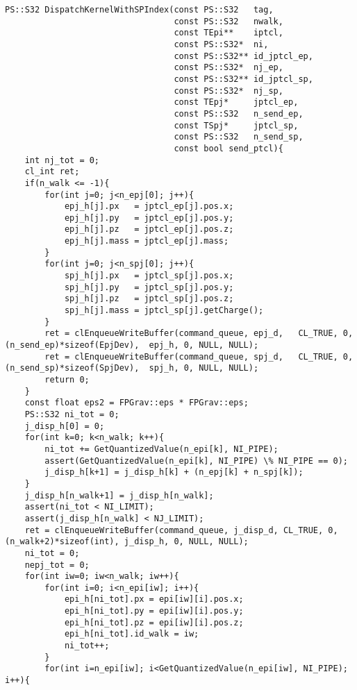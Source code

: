 \begin{itemize}
\begin{lstlisting}[caption=calcForceDispatchExample]
PS::S32 DispatchKernelWithSPIndex(const PS::S32   tag,
                                  const PS::S32   nwalk,
                                  const TEpi**    iptcl,
                                  const PS::S32*  ni,
                                  const PS::S32** id_jptcl_ep,
                                  const PS::S32*  nj_ep,
                                  const PS::S32** id_jptcl_sp,
                                  const PS::S32*  nj_sp,
                                  const TEpj*     jptcl_ep,
                                  const PS::S32   n_send_ep,
                                  const TSpj*     jptcl_sp,
                                  const PS::S32   n_send_sp,
                                  const bool send_ptcl){
    int nj_tot = 0;
    cl_int ret;
    if(n_walk <= -1){
        for(int j=0; j<n_epj[0]; j++){
            epj_h[j].px   = jptcl_ep[j].pos.x;
            epj_h[j].py   = jptcl_ep[j].pos.y;
            epj_h[j].pz   = jptcl_ep[j].pos.z;
            epj_h[j].mass = jptcl_ep[j].mass;
        }
        for(int j=0; j<n_spj[0]; j++){
            spj_h[j].px   = jptcl_sp[j].pos.x;
            spj_h[j].py   = jptcl_sp[j].pos.y;
            spj_h[j].pz   = jptcl_sp[j].pos.z;
            spj_h[j].mass = jptcl_sp[j].getCharge();
        }
        ret = clEnqueueWriteBuffer(command_queue, epj_d,   CL_TRUE, 0, (n_send_ep)*sizeof(EpjDev),  epj_h, 0, NULL, NULL);
        ret = clEnqueueWriteBuffer(command_queue, spj_d,   CL_TRUE, 0, (n_send_sp)*sizeof(SpjDev),  spj_h, 0, NULL, NULL);
        return 0;
    }
    const float eps2 = FPGrav::eps * FPGrav::eps;
    PS::S32 ni_tot = 0;
    j_disp_h[0] = 0;
    for(int k=0; k<n_walk; k++){
        ni_tot += GetQuantizedValue(n_epi[k], NI_PIPE);
        assert(GetQuantizedValue(n_epi[k], NI_PIPE) \% NI_PIPE == 0);
        j_disp_h[k+1] = j_disp_h[k] + (n_epj[k] + n_spj[k]);
    }
    j_disp_h[n_walk+1] = j_disp_h[n_walk];
    assert(ni_tot < NI_LIMIT);
    assert(j_disp_h[n_walk] < NJ_LIMIT);
    ret = clEnqueueWriteBuffer(command_queue, j_disp_d, CL_TRUE, 0, (n_walk+2)*sizeof(int), j_disp_h, 0, NULL, NULL);
    ni_tot = 0;
    nepj_tot = 0;
    for(int iw=0; iw<n_walk; iw++){
        for(int i=0; i<n_epi[iw]; i++){
            epi_h[ni_tot].px = epi[iw][i].pos.x;
            epi_h[ni_tot].py = epi[iw][i].pos.y;
            epi_h[ni_tot].pz = epi[iw][i].pos.z;
            epi_h[ni_tot].id_walk = iw;
            ni_tot++;
        }
        for(int i=n_epi[iw]; i<GetQuantizedValue(n_epi[iw], NI_PIPE); i++){

\end{lstlisting}
\end{itemize}
